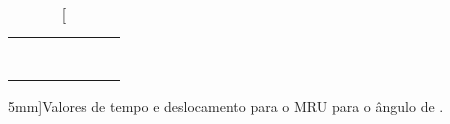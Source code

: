 \begin{table*}[!ht]
\begin{tabular}{lp{25mm}p{25mm}p{25mm}p{25mm}p{25mm}l}
	& \cellcolor[gray]{0.95} & \cellcolor[gray]{0.97} \\ 
	& \cellcolor[gray]{0.89} & \cellcolor[gray]{0.92} \\ 
	& \cellcolor[gray]{0.95} & \cellcolor[gray]{0.97} \\ 
	& \cellcolor[gray]{0.89} & \cellcolor[gray]{0.92} \\ 
	& \cellcolor[gray]{0.95} & \cellcolor[gray]{0.97} \\ 
	& \cellcolor[gray]{0.89} & \cellcolor[gray]{0.92} \\ 
	& \cellcolor[gray]{0.95} & \cellcolor[gray]{0.97} \\ 
	\cmidrule{2-3}
\bottomrule
\end{tabular}
\caption[][5mm]{Valores de tempo e deslocamento para o MRU para o ângulo de .}
\label{DadosMRU}
\end{table*}

